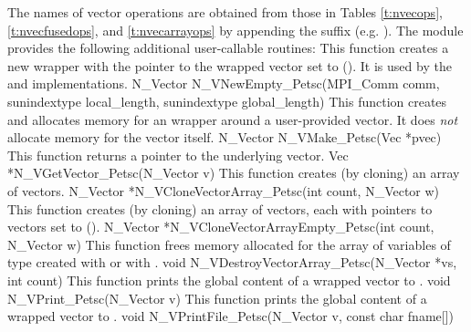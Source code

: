 The names of vector operations are obtained from those in 
Tables \ref{t:nvecops}, \ref{t:nvecfusedops}, and \ref{t:nvecarrayops} by appending the
suffix  (e.g. ).
The module {\nvecpetsc}  provides the following additional user-callable routines:
{ 
  This function creates a new {\nvector} wrapper with the pointer to
  the wrapped {\petsc} vector set to (). It is used by the 
   and  implementations. 
}
{
  N\_Vector N\_VNewEmpty\_Petsc(MPI\_Comm comm, 
  sunindextype local\_length, 
  sunindextype global\_length)
}
{  
  This function creates and allocates memory for an {\nvecpetsc}
  wrapper around a user-provided {\petsc} vector. It does {\em not} 
  allocate memory for the vector  itself.
}
{
  N\_Vector N\_VMake\_Petsc(Vec *pvec)
}
{  
  This function returns a pointer to the underlying {\petsc} vector.
}
{
  Vec *N\_VGetVector\_Petsc(N\_Vector v)
}
{ 
  This function creates (by cloning) an array of  {\nvecpetsc} vectors.
}
{
  N\_Vector *N\_VCloneVectorArray\_Petsc(int count, N\_Vector w)
}
{ 
  This function creates (by cloning) an array of  {\nvecpetsc} vectors,
  each with pointers to {\petsc} vectors set to ().
}
{
  N\_Vector *N\_VCloneVectorArrayEmpty\_Petsc(int count, N\_Vector w)
}
{
  This function frees memory allocated for the array of  variables of
  type  created with  or with
  .
}
{
  void N\_VDestroyVectorArray\_Petsc(N\_Vector *vs, int count)
}
{
  This function prints the global content of a wrapped {\petsc} vector to .
}
{
  void N\_VPrint\_Petsc(N\_Vector v)
}
{  
  This function prints the global content of a wrapped {\petsc} vector to .
}
{
  void N\_VPrintFile\_Petsc(N\_Vector v, const char fname[])
}

